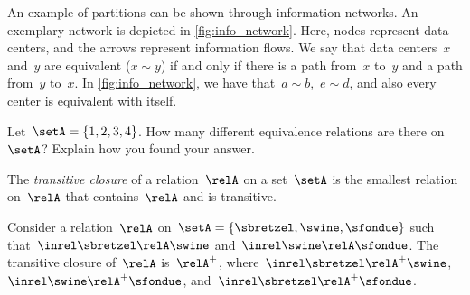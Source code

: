 \begin{example}
    An example of partitions can be shown through information networks.
    An exemplary network is depicted in \cref{fig:info_network}.
    Here, nodes represent data centers, and the arrows represent information flows.
    We say that data centers~$x$ and~$y$ are equivalent ($x\sim y$) if and only if there is a path from~$x$ to~$y$ and a path from~$y$ to~$x$.
    In \cref{fig:info_network}, we have that~$a\sim b$,~$e\sim d$, and also every center is equivalent with itself.
\end{example}




\begin{gradedexercise}
    \label{ex:CountingEquivalenceRelations}
    Let~$\setA = \{ 1, 2, 3, 4 \}$.
    How many different equivalence relations are there on $\setA$?
    Explain how you found your answer.
\end{gradedexercise}



    \begin{ctdefinition}
        \label{def:transitive-closure}
        The \emph{transitive closure} of a relation~$\relA$ on a set~$\setA$ is the smallest relation on~$\relA$ that contains~$\relA$ and is transitive.
    \end{ctdefinition}

\begin{example}
    Consider a relation~$\relA$ on~$\setA=\{\sbretzel,\swine,\sfondue\}$ such that~$\inrel \sbretzel \relA \swine$ and~$\inrel \swine \relA \sfondue$.
    The transitive closure of~$\relA$ is~$\relA^+$, where~$\inrel \sbretzel \relA^+ \swine$,~$\inrel \swine \relA^+ \sfondue$, and~$\inrel \sbretzel \relA^+ \sfondue$.
\end{example}
